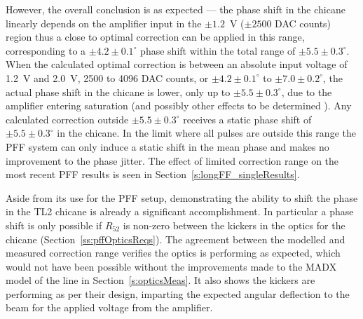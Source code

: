 However, the overall conclusion is as expected --- the phase shift in the chicane linearly depends on the amplifier input in the \(\pm1.2\)~V (\(\pm2500\) DAC counts) region thus a close to optimal correction can be applied in this range, corresponding to a \(\pm4.2\pm0.1^\circ\) phase shift within the total range of \(\pm5.5\pm0.3^\circ\). When the calculated optimal correction is between an absolute input voltage of 1.2~V and 2.0~V, 2500 to 4096 DAC counts, or \(\pm4.2\pm0.1^\circ\) to \(\pm7.0\pm0.2^\circ\), the actual phase shift in the chicane is lower, only up to \(\pm5.5\pm0.3^\circ\), due to the amplifier entering saturation (and possibly other effects to be determined ). Any calculated correction outside \(\pm5.5\pm0.3^\circ\) receives a static phase shift of \(\pm5.5\pm0.3^\circ\) in the chicane. In the limit where all pulses are outside this range the PFF system can only induce a static shift in the mean phase and makes no improvement to the phase jitter. The effect of limited correction range on the most recent PFF results is seen in Section~\ref{s:longFF_singleResults}.

Aside from its use for the PFF setup, demonstrating the ability
 to shift the phase in the TL2 chicane is already a significant 
 accomplishment. In particular a phase shift is only possible if 
 \(R_{52}\) is non-zero between the kickers in the optics for the
 chicane (Section~\ref{ss:pffOpticsReqs}). The agreement between the
 modelled and measured correction range verifies the optics is 
 performing as expected, which would not have been possible without
 the improvements made to the MADX model of the line in
 Section~\ref{s:opticsMeas}. It also shows the kickers are performing
 as per their design, imparting the expected angular deflection to
 the beam for the applied voltage from the amplifier.

%
%



